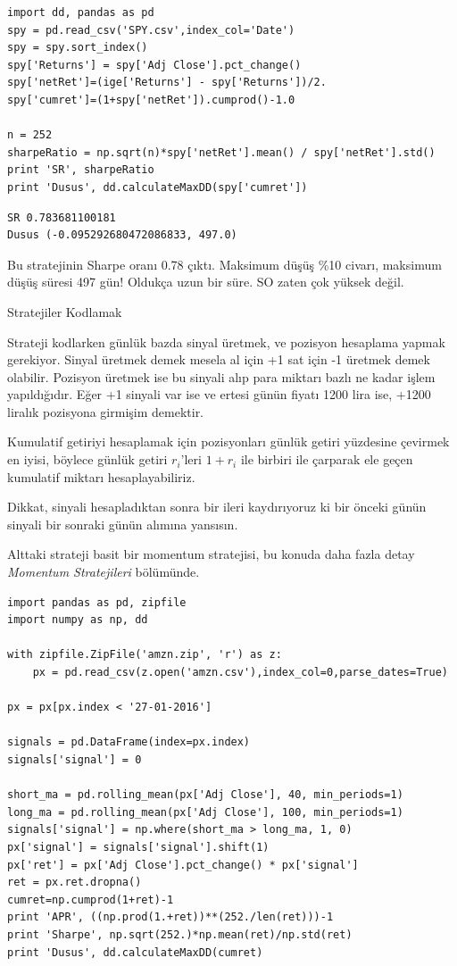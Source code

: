 \documentclass[12pt,fleqn]{article}\usepackage{../../common}
\begin{document}
\inputminted[fontsize=\footnotesize]{python}{dd.py}

\begin{verbatim}
import dd, pandas as pd
spy = pd.read_csv('SPY.csv',index_col='Date')
spy = spy.sort_index()
spy['Returns'] = spy['Adj Close'].pct_change()
spy['netRet']=(ige['Returns'] - spy['Returns'])/2.
spy['cumret']=(1+spy['netRet']).cumprod()-1.0

n = 252 
sharpeRatio = np.sqrt(n)*spy['netRet'].mean() / spy['netRet'].std()
print 'SR', sharpeRatio
print 'Dusus', dd.calculateMaxDD(spy['cumret'])
\end{verbatim}

\begin{verbatim}
SR 0.783681100181
Dusus (-0.095292680472086833, 497.0)
\end{verbatim}

Bu stratejinin Sharpe oranı 0.78 çıktı. Maksimum düşüş \%10 civarı,
maksimum düşüş süresi 497 gün! Oldukça uzun bir süre. SO zaten çok yüksek
değil.

Stratejiler Kodlamak

Strateji kodlarken günlük bazda sinyal üretmek, ve pozisyon hesaplama yapmak
gerekiyor. Sinyal üretmek demek mesela al için +1 sat için -1 üretmek demek
olabilir. Pozisyon üretmek ise bu sinyali alıp para miktarı bazlı ne kadar işlem
yapıldığıdır. Eğer +1 sinyali var ise ve ertesi günün fiyatı 1200 lira ise, +1200
liralık pozisyona girmişim demektir.

Kumulatif getiriyi hesaplamak için pozisyonları günlük getiri yüzdesine çevirmek
en iyisi, böylece günlük getiri $r_i$'leri $1+r_i$ ile birbiri ile çarparak ele
geçen kumulatif miktarı hesaplayabiliriz.

Dikkat, sinyali hesapladıktan sonra bir ileri kaydırıyoruz ki bir önceki günün
sinyali bir sonraki günün alımına yansısın.

Alttaki strateji basit bir momentum stratejisi, bu konuda daha fazla detay {\em
  Momentum Stratejileri} bölümünde.

\begin{verbatim}
import pandas as pd, zipfile
import numpy as np, dd

with zipfile.ZipFile('amzn.zip', 'r') as z:
    px = pd.read_csv(z.open('amzn.csv'),index_col=0,parse_dates=True)

px = px[px.index < '27-01-2016']

signals = pd.DataFrame(index=px.index) 
signals['signal'] = 0 

short_ma = pd.rolling_mean(px['Adj Close'], 40, min_periods=1) 
long_ma = pd.rolling_mean(px['Adj Close'], 100, min_periods=1) 
signals['signal'] = np.where(short_ma > long_ma, 1, 0) 
px['signal'] = signals['signal'].shift(1) 
px['ret'] = px['Adj Close'].pct_change() * px['signal']
ret = px.ret.dropna()
cumret=np.cumprod(1+ret)-1
print 'APR', ((np.prod(1.+ret))**(252./len(ret)))-1
print 'Sharpe', np.sqrt(252.)*np.mean(ret)/np.std(ret)
print 'Dusus', dd.calculateMaxDD(cumret)
\end{verbatim}
\end{document}
